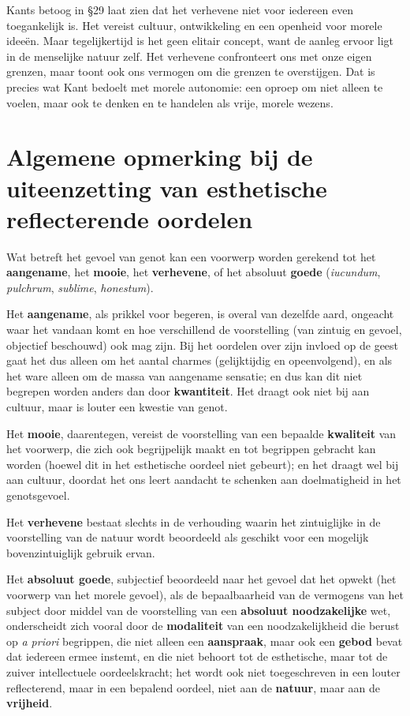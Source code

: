 \begin{mdframed}[leftmargin=0pt,rightmargin=0pt,backgroundcolor=blue!6,linecolor=white,innertopmargin=6pt,innerbottommargin=6pt]
Kants betoog in §29 laat zien dat het verhevene niet voor iedereen even toegankelijk is. Het vereist cultuur, ontwikkeling en een openheid voor morele ideeën. Maar tegelijkertijd is het geen elitair concept, want de aanleg ervoor ligt in de menselijke natuur zelf. Het verhevene confronteert ons met onze eigen grenzen, maar toont ook ons vermogen om die grenzen te overstijgen. Dat is precies wat Kant bedoelt met morele autonomie: een oproep om niet alleen te voelen, maar ook te denken en te handelen als vrije, morele wezens.

\end{mdframed}

\section*{Algemene opmerking bij de uiteenzetting van esthetische reflecterende oordelen}

Wat betreft het gevoel van genot kan een voorwerp worden gerekend tot het \textbf{aangename}, het \textbf{mooie}, het \textbf{verhevene}, of het absoluut \textbf{goede} (\textit{iucundum}, \textit{pulchrum}, \textit{sublime}, \textit{honestum}).

Het \textbf{aangename}, als prikkel voor begeren, is overal van dezelfde aard, ongeacht waar het vandaan komt en hoe verschillend de voorstelling (van zintuig en gevoel, objectief beschouwd) ook mag zijn. Bij het oordelen over zijn invloed op de geest gaat het dus alleen om het aantal charmes (gelijktijdig en opeenvolgend), en als het ware alleen om de massa van aangename sensatie; en dus kan dit niet begrepen worden anders dan door \textbf{kwantiteit}. Het draagt ook niet bij aan cultuur, maar is louter een kwestie van genot.

Het \textbf{mooie}, daarentegen, vereist de voorstelling van een bepaalde \textbf{kwaliteit} van het voorwerp, die zich ook begrijpelijk maakt en tot begrippen gebracht kan worden (hoewel dit in het esthetische oordeel niet gebeurt); en het draagt wel bij aan cultuur, doordat het ons leert aandacht te schenken aan doelmatigheid in het genotsgevoel.

Het \textbf{verhevene} bestaat slechts in de verhouding waarin het zintuiglijke in de voorstelling van de natuur wordt beoordeeld als geschikt voor een mogelijk bovenzintuiglijk gebruik ervan.

Het \textbf{absoluut goede}, subjectief beoordeeld naar het gevoel dat het opwekt (het voorwerp van het morele gevoel), als de bepaalbaarheid van de vermogens van het subject door middel van de voorstelling van een \textbf{absoluut noodzakelijke} wet, onderscheidt zich vooral door de \textbf{modaliteit} van een noodzakelijkheid die berust op \textit{a priori} begrippen, die niet alleen een \textbf{aanspraak}, maar ook een \textbf{gebod} bevat dat iedereen ermee instemt, en die niet behoort tot de esthetische, maar tot de zuiver intellectuele oordeelskracht; het wordt ook niet toegeschreven in een louter reflecterend, maar in een bepalend oordeel, niet aan de \textbf{natuur}, maar aan de \textbf{vrijheid}.

